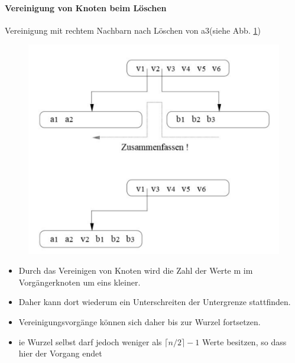 \paragraph{Vereinigung von Knoten beim L\"oschen} 

Vereinigung mit rechtem Nachbarn nach L\"oschen von a3(siehe Abb. \ref{loeschen_01})
\begin{figure}[h!] %
	\centering
	\includegraphics[width=0.7\linewidth]{images/loeschen_01}
	\caption{}
	\label{loeschen_01}
\end{figure}
\newpage
\begin{itemize}
	\item Durch das Vereinigen von Knoten wird die Zahl der Werte m im Vorg\"angerknoten um eins kleiner.
	\item Daher kann dort wiederum ein Unterschreiten der Untergrenze stattfinden.
	\item Vereinigungsvorg\"ange k\"onnen sich daher bis zur Wurzel fortsetzen.
	\item ie Wurzel selbst darf jedoch weniger als $\lceil n/2\rceil -1$ Werte besitzen, so dass hier der Vorgang endet
	
\end{itemize}
